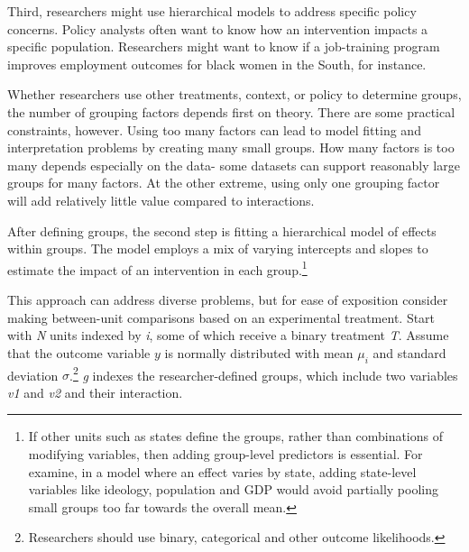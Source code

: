 \documentclass[12pt]{article}
\begin{document}
Third, researchers might use hierarchical models to address specific policy concerns.
Policy analysts often want to know how an intervention impacts a specific population. 
Researchers might want to know if a job-training program improves employment outcomes for black women in the South, for instance.  


Whether researchers use other treatments, context, or policy to determine groups, the number of grouping factors depends first on theory.
There are some practical constraints, however.
Using too many factors can lead to model fitting and interpretation problems by creating many small groups.
How many factors is too many depends especially on the data- some datasets can support reasonably large groups for many factors. 
At the other extreme, using only one grouping factor will add relatively little value compared to interactions. 



After defining groups, the second step is fitting a hierarchical model of effects within groups.
The model employs a mix of varying intercepts and slopes to estimate the impact of an intervention in each group.\footnote{If other units such as states define the groups, rather than combinations of modifying variables, then adding group-level predictors is essential. For examine, in a model where an effect varies by state, adding state-level variables like ideology, population and GDP would avoid partially pooling small groups too far towards the overall mean.}


This approach can address diverse problems, but for ease of exposition consider making between-unit comparisons based on an experimental treatment.    
Start with \textit{N} units indexed by \textit{i}, some of which receive a binary treatment \textit{T}.
Assume that the outcome variable ${y}$ is normally distributed with mean $\mu_i$ and standard deviation $\sigma$.\footnote{Researchers should use binary, categorical and other outcome likelihoods.}
\textit{g} indexes the researcher-defined groups, which include two variables \textit{v1} and \textit{v2} and their interaction.
\end{document}
